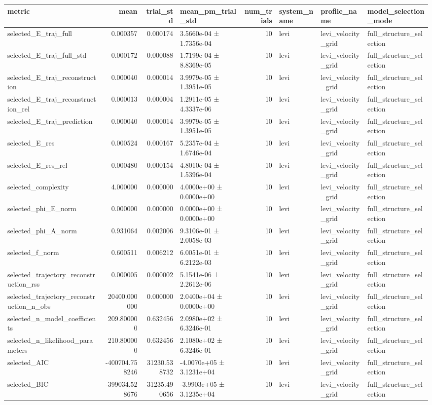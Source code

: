 \begin{tabular}{lrrlrlll}
\toprule
metric & mean & trial_std & mean_pm_trial_std & num_trials & system_name & profile_name & model_selection_mode \\
\midrule
selected_E_traj_full & 0.000357 & 0.000174 & 3.5660e-04 ± 1.7356e-04 & 10 & levi & levi_velocity_grid & full_structure_selection \\
selected_E_traj_full_std & 0.000172 & 0.000088 & 1.7199e-04 ± 8.8369e-05 & 10 & levi & levi_velocity_grid & full_structure_selection \\
selected_E_traj_reconstruction & 0.000040 & 0.000014 & 3.9979e-05 ± 1.3951e-05 & 10 & levi & levi_velocity_grid & full_structure_selection \\
selected_E_traj_reconstruction_rel & 0.000013 & 0.000004 & 1.2911e-05 ± 4.3337e-06 & 10 & levi & levi_velocity_grid & full_structure_selection \\
selected_E_traj_prediction & 0.000040 & 0.000014 & 3.9979e-05 ± 1.3951e-05 & 10 & levi & levi_velocity_grid & full_structure_selection \\
selected_E_res & 0.000524 & 0.000167 & 5.2357e-04 ± 1.6746e-04 & 10 & levi & levi_velocity_grid & full_structure_selection \\
selected_E_res_rel & 0.000480 & 0.000154 & 4.8010e-04 ± 1.5396e-04 & 10 & levi & levi_velocity_grid & full_structure_selection \\
selected_complexity & 4.000000 & 0.000000 & 4.0000e+00 ± 0.0000e+00 & 10 & levi & levi_velocity_grid & full_structure_selection \\
selected_phi_E_norm & 0.000000 & 0.000000 & 0.0000e+00 ± 0.0000e+00 & 10 & levi & levi_velocity_grid & full_structure_selection \\
selected_phi_A_norm & 0.931064 & 0.002006 & 9.3106e-01 ± 2.0058e-03 & 10 & levi & levi_velocity_grid & full_structure_selection \\
selected_f_norm & 0.600511 & 0.006212 & 6.0051e-01 ± 6.2122e-03 & 10 & levi & levi_velocity_grid & full_structure_selection \\
selected_trajectory_reconstruction_rss & 0.000005 & 0.000002 & 5.1541e-06 ± 2.2612e-06 & 10 & levi & levi_velocity_grid & full_structure_selection \\
selected_trajectory_reconstruction_n_obs & 20400.000000 & 0.000000 & 2.0400e+04 ± 0.0000e+00 & 10 & levi & levi_velocity_grid & full_structure_selection \\
selected_n_model_coefficients & 209.800000 & 0.632456 & 2.0980e+02 ± 6.3246e-01 & 10 & levi & levi_velocity_grid & full_structure_selection \\
selected_n_likelihood_parameters & 210.800000 & 0.632456 & 2.1080e+02 ± 6.3246e-01 & 10 & levi & levi_velocity_grid & full_structure_selection \\
selected_AIC & -400704.758246 & 31230.538732 & -4.0070e+05 ± 3.1231e+04 & 10 & levi & levi_velocity_grid & full_structure_selection \\
selected_BIC & -399034.528676 & 31235.490656 & -3.9903e+05 ± 3.1235e+04 & 10 & levi & levi_velocity_grid & full_structure_selection \\
\bottomrule
\end{tabular}
